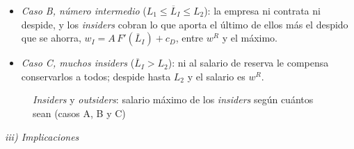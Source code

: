 \documentclass[11pt]{article}
\begin{document}
\begin{itemize}
\begin{itemize}
  \item \emph{Caso B, número intermedio} ($L_1\leq\overline{L}_I\leq L_2$): la empresa ni contrata ni despide, y los \emph{insiders} cobran lo que aporta el último de ellos más el despido que se ahorra, $w_I=A\,F'(\overline{L}_I)+c_D$, entre $w^R$ y el máximo.
  \item \emph{Caso C, muchos insiders} ($\overline{L}_I>L_2$): ni al salario de reserva le compensa conservarlos a todos; despide hasta $L_2$ y el salario es $w^R$.
  \end{itemize}
\end{itemize}

\begin{figure}[H]
\centering
\caption{\emph{Insiders} y \emph{outsiders}: salario máximo de los \emph{insiders} según cuántos sean (casos A, B y C)}\label{fig:insiders}
\end{figure}

\hspace*{3.6em}\emph{iii) Implicaciones}
\end{document}

